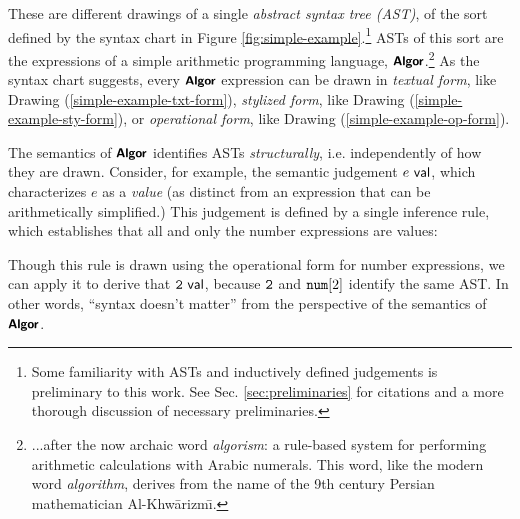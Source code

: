 \noindent
These are different drawings of a single \emph{abstract syntax tree (AST)}, of the sort defined by the syntax chart in Figure \ref{fig:simple-example}.\footnote{Some familiarity with ASTs and inductively defined judgements is preliminary to this work. See Sec. \ref{sec:preliminaries} for citations and a more thorough discussion of necessary preliminaries.} ASTs of this sort are the expressions of a simple arithmetic programming language, $\simplelang$.\footnote{...after the now archaic word \emph{algorism}: a rule-based system for performing arithmetic calculations with Arabic numerals. This word, like the modern word \emph{algorithm}, derives from the name of the 9th century Persian mathematician Al-Khw\={a}rizm\=\i.} 
As the syntax chart suggests, every $\simplelang$ expression can be drawn in \emph{textual form}, like Drawing (\ref{simple-example-txt-form}), \emph{stylized form}, like Drawing (\ref{simple-example-sty-form}), or \emph{operational form}, like Drawing (\ref{simple-example-op-form}).





 The semantics of $\simplelang$ identifies ASTs \emph{structurally}, i.e. independently of how they are drawn. Consider, for example, the semantic judgement $\isvalU{e}$, which characterizes $e$ as a \emph{value} (as distinct from an expression that can be arithmetically simplified.) This judgement is defined by a single inference rule, which establishes that all and only the number expressions are values:
\begin{mathpar}
\end{mathpar}
Though this rule is drawn using the operational form for number expressions, we can apply it to derive that $\isvalU{\numintro{2}}$, because $\numintro{2}$ and $\anumintro{2}$ identify the same AST. In other words, ``syntax doesn't matter'' from the perspective of the semantics of $\simplelang$.


